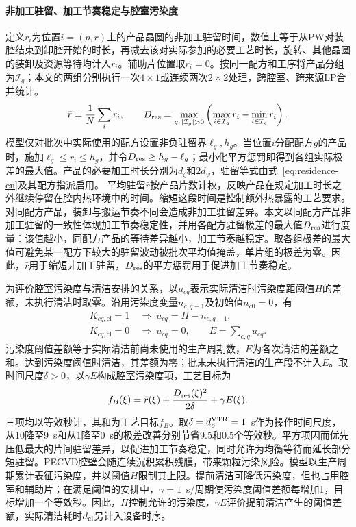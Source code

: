 \documentclass[final,5p,times,twocolumn]{elsarticle}
\begin{document}
\paragraph{非加工驻留、加工节奏稳定与腔室污染度}
定义$r_i$为位置$i=(p,r)$上的产品晶圆的非加工驻留时间，数值上等于从PW对装腔结束到卸腔开始的时长，再减去该对实际参加的必要工艺时长，旋转、其他晶圆的装卸及资源等待均计入$r_i$。辅助片位置取$r_i=0$。按同一配方和工序将产品分组为$\mathcal I_g$；本文的两组分别执行一次$4\times1$或连续两次$2\times2$处理，跨腔室、跨来源LP合并统计。
\begin{equation}
\bar r=\frac{1}{N}\sum_i r_i,\qquad
D_{\rm res}=\max_{g:\,|\mathcal I_g|>0}
\left(\max_{i\in\mathcal I_g}r_i-\min_{i\in\mathcal I_g}r_i\right).
\label{eq:secondary-residence-cn}
\end{equation}
模型仅对批次中实际使用的配方设置非负驻留界$\ell_g,h_g$。当位置$i$分配配方$g$的产品时，施加$\ell_g\le r_i\le h_g$，并令$D_{\rm res}\ge h_g-\ell_g$；最小化平方惩罚即得到各组实际极差的最大值。产品的必要加工时长分别为$d_\zeta$和$2d_\psi$，驻留等式由式~\eqref{eq:residence-cn}及其配方指派启用。
平均驻留$\bar r$按产品片数计权，反映产品在规定加工时长之外继续停留在腔内热环境中的时间。缩短这段时间是控制额外热暴露的工艺要求。对同配方产品，装卸与搬运节奏不同会造成非加工驻留差异。本文以同配方产品非加工驻留的一致性体现加工节奏稳定性，并用各配方驻留极差的最大值$D_{\rm res}$进行度量：该值越小，同配方产品的等待差异越小，加工节奏越稳定。取各组极差的最大值可避免某一配方下较大的驻留波动被批次平均值掩盖，单片组的极差为零。因此，$\bar r$用于缩短非加工驻留，$D_{\rm res}$的平方惩罚用于促进加工节奏稳定。

为评价腔室污染度与清洁安排的关系，以$u_{cq}$表示实际清洁时污染度距阈值$H$的差额，未执行清洁时取零。沿用污染度变量$n_{c,q-1}$及初始值$n_{c0}=0$，有
\begin{equation}
\begin{aligned}
K_{cq,\mathrm{cl}}=1 &\ \Rightarrow\ u_{cq}=H-n_{c,q-1},\\
K_{cq,\mathrm{cl}}=0 &\ \Rightarrow\ u_{cq}=0,\qquad
E=\sum_{c,q}u_{cq}.
\end{aligned}
\label{eq:secondary-clean-cn}
\end{equation}
污染度阈值差额等于实际清洁前尚未使用的生产周期数，$E$为各次清洁的差额之和。达到污染度阈值时清洁，其差额为零；批末未执行清洁的生产段不计入$E$。取时间尺度$\delta>0$，以$\gamma E$构成腔室污染度项，工艺目标为
\begin{equation}
f_B(\xi)=\bar r(\xi)+\frac{D_{\rm res}(\xi)^2}{2\delta}+\gamma E(\xi).
\label{eq:secondary-objective-cn}
\end{equation}
三项均以等效秒计，其和为工艺目标$f_B$。取$\delta=d_o^{\rm VTR}=1$~s作为操作时间尺度，从10降至9~s和从1降至0~s的极差改善分别节省9.5和0.5个等效秒。平方项因而优先压低最大的片间驻留差异，以促进加工节奏稳定，同时允许为均衡等待而延长部分短驻留。PECVD腔壁会随连续沉积累积残膜，带来颗粒污染风险\citep{lee2025wall}。模型以生产周期累计表征污染度，并以阈值$H$限制其上限。提前清洁可降低污染度，但也占用腔室和辅助片；在满足阈值的安排中，$\gamma=1$~s/周期使污染度阈值差额每增加1，目标增加一个等效秒。因此，$H$控制允许的污染度，$\gamma E$评价提前清洁产生的阈值差额，实际清洁耗时$d_{\rm cl}$另计入设备时序。
\end{document}
